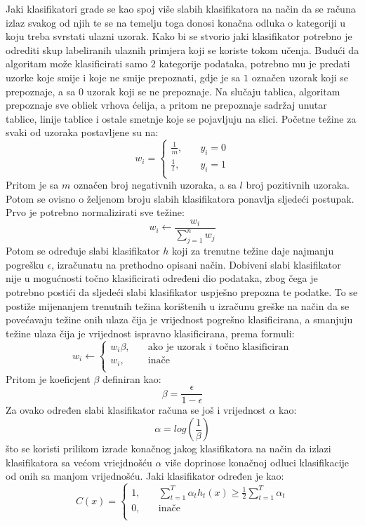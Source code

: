 \documentclass[times, utf8, zavrsni, numeric]{fer}
\begin{document}
Jaki klasifikatori grade se kao spoj više slabih klasifikatora na način da se računa izlaz svakog od njih te se na temelju toga donosi konačna odluka o kategoriji u koju treba svrstati ulazni uzorak.
Kako bi se stvorio jaki klasifikator potrebno je odrediti skup labeliranih ulaznih primjera koji se koriste tokom učenja.
Budući da algoritam može klasificirati samo $2$ kategorije podataka, potrebno mu je predati uzorke koje smije i koje ne smije prepoznati, gdje je sa $1$ označen uzorak koji se prepoznaje, a sa $0$ uzorak koji se ne prepoznaje.
Na slučaju tablica, algoritam prepoznaje sve obliek vrhova ćelija, a pritom ne prepoznaje sadržaj unutar tablice, linije tablice i ostale smetnje koje se pojavljuju na slici.
Početne težine za svaki od uzoraka postavljene su na: 
\[
    w_i = 
    \begin{cases}
    \frac{1}{m}, & \quad y_i = 0\\
    \frac{1}{l}, & \quad y_i = 1\\
    \end{cases}
\]
Pritom je sa $m$ označen broj negativnih uzoraka, a sa $l$ broj pozitivnih uzoraka.
Potom se ovisno o željenom broju slabih klasifikatora ponavlja sljedeći postupak.
Prvo je potrebno normalizirati sve težine:
\[
    w_i \leftarrow \frac{w_i}{
        \displaystyle \sum_{j = 1}^{n}w_j
    }
\]
Potom se određuje slabi klasifikator $h$ koji za trenutne težine daje najmanju pogrešku $\epsilon$, izračunatu na prethodno opisani način.
Dobiveni slabi klasifikator nije u mogućnosti točno klasificirati određeni dio podataka, zbog čega je potrebno postići da sljedeći slabi klasifikator uspješno prepozna te podatke.
To se postiže mijenanjem trenutnih težina korištenih u izračunu greške na način da se povećavaju težine onih ulaza čija je vrijednost pogrešno klasificirana, a smanjuju težine ulaza čija je vrijednost ispravno klasificirana, prema formuli:
\[
    w_i \leftarrow 
    \begin{cases}
        w_i\beta, & \quad \text{ako je uzorak $i$ točno klasificiran}\\
        w_i, & \quad \text{inače}\\
    \end{cases}
\]
Pritom je koeficjent $\beta$ definiran kao: 
\[
    \beta = \frac{\epsilon}{1 - \epsilon}
\]
Za ovako određen slabi klasifikator računa se još i vrijednost $\alpha$ kao: 
\[
    \alpha = log(\frac{1}{\beta})
\]
što se koristi prilikom izrade konačnog jakog klasifikatora na način da izlazi klasifikatora sa većom vriejdnošću $\alpha$ više doprinose konačnoj odluci klasifikacije od onih sa manjom vrijednošću.
Jaki klasifikator određen je kao:
\[
    C(x) = 
    \begin{cases}
        1, & \quad 
            \displaystyle \sum_{t = 1}^{T}
            \alpha_th_t(x)
            \geq
            \frac{1}{2} \displaystyle \sum_{t = 1}^{T}\alpha_t\\
        0, & \quad \text{inače}\\
    \end{cases}
\]
\end{document}

